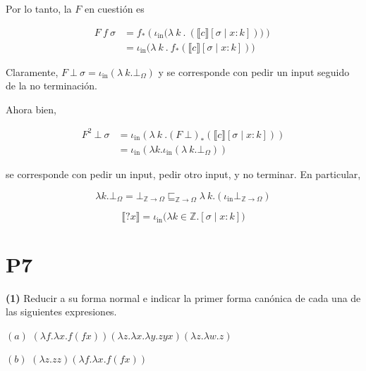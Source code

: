 \documentclass[article, 12pt]{article}
\begin{document}
Por lo tanto, la $F$ en cuestión es

\begin{align*}
  F ~ f ~ \sigma 
  &= f_* \left( \iota_{\text{in}} \big( \lambda ~k~.~\left(
  \llbracket c \rrbracket[\sigma \mid x : k] \right)  \big) \right) \\ 
  &=\iota_{\text{in}}\Big( \lambda ~ k ~ . ~ f_* \left( \llbracket c
  \rrbracket[\sigma \mid x : k] \right)  \Big)
\end{align*}

Claramente, $F ~ \bot ~ \sigma = \iota_{\text{in}}(\lambda ~ k . \bot_\Omega ) 
$ y se corresponde con pedir un input seguido de la no terminación.

Ahora bien,


\begin{align*}
  F^2 ~ \bot ~ \sigma 
  &= \iota_{\text{in}}\left( \lambda ~ k ~ . (F~\bot)_*(\llbracket c
  \rrbracket[\sigma \mid x : k]) \right)  \\ 
  &= \iota_{\text{in}} \left( \lambda k . \iota_{\text{in}}(\lambda ~k.\bot_\Omega)\right)
\end{align*}

se corresponde con pedir un input, pedir otro input, y no terminar. En
particular, 

\begin{equation*}
  \lambda k.\bot_\Omega = \bot_{\mathbb{Z} \to \Omega}
  \sqsubseteq_{\mathbb{Z}\to \Omega} \lambda ~k.(\iota_{\text{in}}
  \bot_{\mathbb{Z}\to \Omega})
\end{equation*}


\pagebreak 

\begin{equation*}
  \llbracket ?x \rrbracket = \iota_{\text{in}} \Big( \lambda k \in
  \mathbb{Z}.[\sigma \mid x : k] \Big)
\end{equation*}

\pagebreak 

\section{P7}

\begin{myframe}
  \textbf{(1)} Reducir a su forma normal e indicar la primer forma canónica de
  cada una de las siguientes expresiones.

  $(a)$ $\left( \lambda f. \lambda x. f ( fx ) \right)\left( \lambda z. \lambda x.
  \lambda y. zyx \right) \left( \lambda z. \lambda w. z \right)   $

  $(b)$ $\left( \lambda z . zz \right) \left( \lambda f.\lambda x. f(fx) \right) $ 
\end{myframe}
\end{document}
